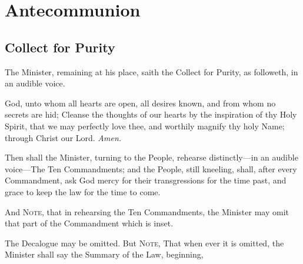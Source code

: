 \fancyhead[RE,LO]{\textit{}}
\section{Antecommunion}\label{Antecommunion}

\subsection{Collect for Purity}
\begin{rubric}
    The Minister, remaining at his place, saith the Collect for Purity, as followeth, in an audible voice.
\end{rubric}
 God, unto whom all hearts are open, all desires known, and from whom no secrets are hid; Cleanse the thoughts of our hearts by the inspiration of thy Holy Spirit, that we may perfectly love thee, and worthily magnify thy holy Name; through Christ our Lord. \textit{Amen.}
\begin{rubric}
Then shall the Minister, turning to the People, rehearse distinctly---in an audible voice---The Ten Commandments; and the People, still kneeling, shall, after every Commandment, ask God mercy for their transgressions for the time past, and grace to keep the law for the time to come.
\end{rubric}
\begin{rubric}
And \textsc{Note,} that in rehearsing the Ten Commandments, the Minister may omit that part of the Commandment which is inset.
\end{rubric}
\begin{rubric}
	The Decalogue may be omitted. But \textsc{Note,} That when ever it is omitted, the Minister shall say the Summary of the Law, beginning, 
\end{rubric}


